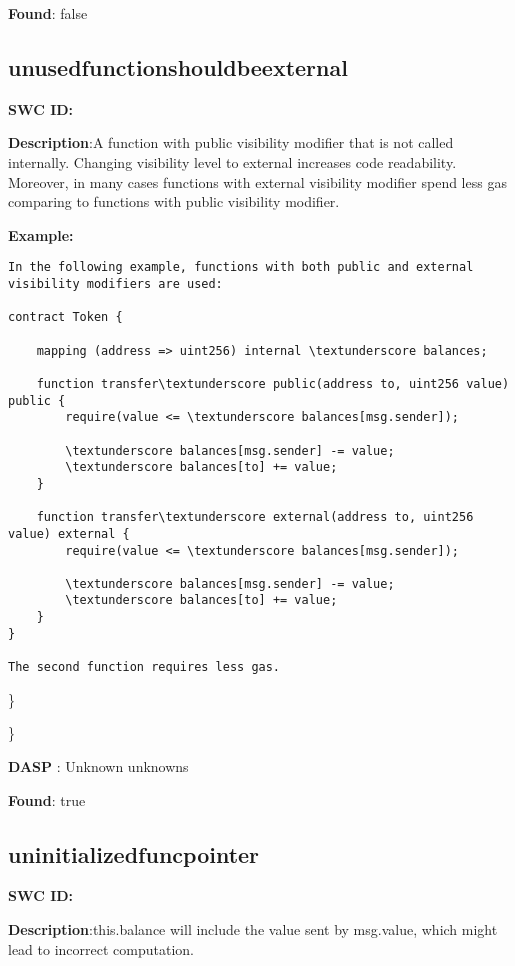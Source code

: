 \documentclass{article}
\begin{document}
\textbf{Found}: false

\subsection{unused\textunderscore function\textunderscore should\textunderscore be\textunderscore external} 
\textbf{SWC \textunderscore ID:} 

\textbf{Description}:A function with public visibility modifier that is not called internally. Changing visibility level to external increases code readability. Moreover, in many cases functions with external visibility modifier spend less gas comparing to functions with public visibility modifier.


\textbf{Example:} 
\begin{verbatim}
In the following example, functions with both public and external visibility modifiers are used:

contract Token {

    mapping (address => uint256) internal \textunderscore balances;

    function transfer\textunderscore public(address to, uint256 value) public {
        require(value <= \textunderscore balances[msg.sender]);

        \textunderscore balances[msg.sender] -= value;
        \textunderscore balances[to] += value;
    }

    function transfer\textunderscore external(address to, uint256 value) external {
        require(value <= \textunderscore balances[msg.sender]);

        \textunderscore balances[msg.sender] -= value;
        \textunderscore balances[to] += value;
    }
}

The second function requires less gas.

\end{verbatim}\} 

\} 

\textbf{DASP} : Unknown unknowns

\textbf{Found}: true

\subsection{uninitialized\textunderscore func\textunderscore pointer} 
\textbf{SWC \textunderscore ID:} 

\textbf{Description}:this.balance will include the value sent by msg.value, which might lead to incorrect computation.
\end{document}
